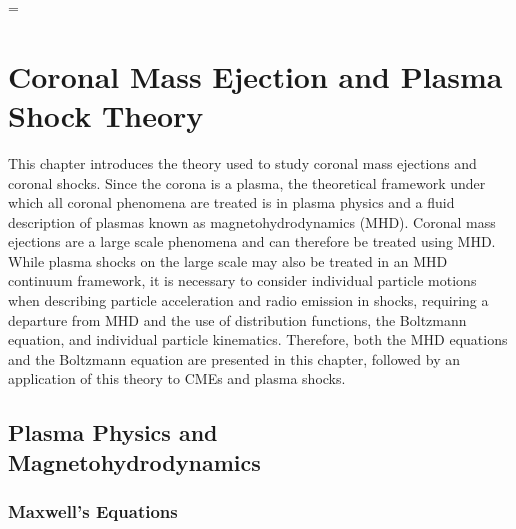 =%
\singlespacing
\chapter{Coronal Mass Ejection and Plasma Shock Theory} 
\label{chap:2}
\doublespacing
This chapter introduces the theory used to study coronal mass ejections and coronal shocks. Since the corona is a plasma, the theoretical framework under which all coronal phenomena are treated is in plasma physics and a fluid description of plasmas known as magnetohydrodynamics (MHD). Coronal mass ejections are a large scale phenomena and can therefore be treated using MHD. While plasma shocks on the large scale may also be treated in an MHD continuum framework, it is necessary to consider individual particle motions when describing particle acceleration and radio emission in shocks, requiring a departure from MHD and the use of distribution functions, the Boltzmann equation, and individual particle kinematics. Therefore, both the MHD equations and the Boltzmann equation are presented in this chapter, followed by an application of this theory to CMEs and plasma shocks.

\singlespacing
\section{Plasma Physics and  \\ Magnetohydrodynamics}\label{sec:1}
\doublespacing
\subsection{Maxwell's Equations}\label{sec:10}

